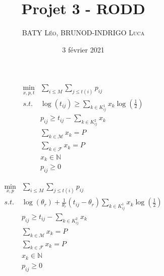 \documentclass[12pt]{extarticle}
\title{Projet 3 -  RODD}
\date{3 février 2021}
\author{\textsc{BATY Léo}, \textsc{BRUNOD-INDRIGO Luca}}
\begin{document}
\maketitle

\begin{align*}
    \min_{x, p, t} &\sum_{i \leq M} \sum_{j \leq t(i)} p_{ij}\\
    s.t.   & \log(t_{ij}) \geq \sum_{k \in K_{ij}^1} x_k \log\left(\frac{1}{2}\right)\\
           & p_{ij} \geq t_{ij} - \sum_{k \in K_{ij}^2} x_k\\
           & \sum_{k \in \mathcal{M}} x_k = P\\
           & \sum_{k \in \mathcal{F}} x_k = P\\
           & x_k \in \mathbb{N}\\
           & p_{ij} \geq 0
\end{align*}

\begin{align*}
    \min_{x, p} &\sum_{i \leq M} \sum_{j \leq t(i)} p_{ij}\\
    s.t.   & \log(\theta_r) + \frac{1}{\theta_r}(t_{ij} - \theta_r) \sum_{k \in K_{ij}^1} x_k \log\left(\frac{1}{2}\right)\\
           & p_{ij} \geq t_{ij} - \sum_{k \in K_{ij}^2} x_k     \\      
           & \sum_{k \in \mathcal{M}} x_k = P\\
           & \sum_{k \in \mathcal{F}} x_k = P\\
           & x_k \in \mathbb{N}\\
           & p_{ij} \geq 0
\end{align*}
\end{document}

